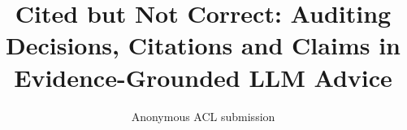 \title{Cited but Not Correct: Auditing Decisions, Citations and Claims in Evidence-Grounded LLM Advice}
\author{Anonymous ACL submission}
